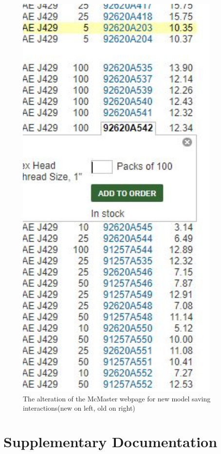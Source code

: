 \documentclass[12pt, letterpaper]{article}
\begin{document}
\begin{figure}[H]
\begin{minipage}{0.2\textwidth}
        \includegraphics[width=0.9\textwidth]{Figures/webBrowserOld.JPG}
    \end{minipage}
    \caption{The alteration of the McMaster webpage for new model saving interactions(new on left, old on right)}
\end{figure}
\section{Supplementary Documentation}
\end{document}
